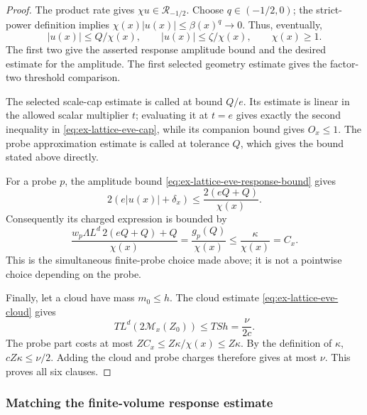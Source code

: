 \begin{proof}
The product rate gives $\chi u\in\mathcal R_{-1/2}$. Choose
$q\in(-1/2,0)$; the strict-power definition implies
$\chi(x)|u(x)|\le\beta(x)^q\to0$. Thus, eventually,
\begin{equation}
 |u(x)|\le Q/\chi(x),\qquad |u(x)|\le\zeta/\chi(x),\qquad \chi(x)\ge1.
 \label{eq:ex-lattice-eve-response-bound}
\end{equation}
The first two give the asserted response amplitude bound and the desired
estimate for the amplitude. The first selected geometry estimate gives
the factor-two threshold comparison.

The selected scale-cap estimate is called at bound $Q/e$. Its estimate
is linear in the allowed scalar multiplier $t$; evaluating it at $t=e$
gives exactly the second inequality in \eqref{eq:ex-lattice-eve-cap}, while its companion bound gives
$O_x\le1$. The probe approximation estimate is called at tolerance $Q$,
which gives the bound stated above directly.

For a probe $p$, the amplitude bound
\eqref{eq:ex-lattice-eve-response-bound} gives
\begin{equation}\label{eq:ex-lattice-eve-amplitude}
 2(e|u(x)|+\delta_x)
       \le \frac{2(eQ+Q)}{\chi(x)}.
\end{equation}
Consequently its charged expression is bounded by
\[
 \frac{w_p\Lambda L^d\,2(eQ+Q)+Q}{\chi(x)}
   =\frac{g_p(Q)}{\chi(x)}
   \le \frac{\kappa}{\chi(x)}=C_x.
\]
This is the simultaneous finite-probe choice made above; it is not a
pointwise choice depending on the probe.

Finally, let a cloud have mass $m_0\le h$. The cloud estimate \eqref{eq:ex-lattice-eve-cloud} gives
\[
 T L^d(2\mathcal M_x(Z_0))\le T S h=\frac{\nu}{2c}.
\]
The probe part costs at most $ZC_x\le Z\kappa/\chi(x)\le Z\kappa$.
By the definition of $\kappa$, $cZ\kappa\le\nu/2$. Adding the cloud and
probe charges therefore gives at most $\nu$. This proves all six clauses.
\end{proof}

\subsubsection{Matching the finite-volume response estimate}
\label{subsec:ex-lattice-eve-matching}

